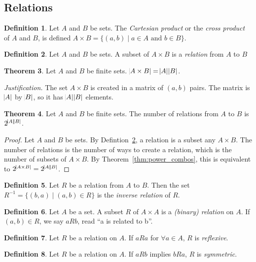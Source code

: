 \documentclass[11pt]{article}
\theoremstyle{definition}
\newtheorem{theorem}{Theorem}[section]
\newtheorem{definition}[theorem]{Definition}
\newenvironment{just}{\textit{Justification.}}{}
\begin{document}
\subsection{Relations}
\begin{definition}
    Let $A$ and $B$ be sets. The \emph{Cartesian product} or the \emph{cross product} of $A$ and $B$, is defined $A \times B = \{(a,b) \mid a\in A \text{ and } b\in B \}$.
\end{definition}
\begin{definition}
    Let $A$ and $B$ be sets. A subset of $A \times B$ is a \emph{relation} from $A$ to $B$
    \label{def:relation}
\end{definition}
\begin{theorem}
    Let $A$ and $B$ be finite sets. $\abs{A\times B} = \abs{A}\abs{B}$.
\end{theorem}
\begin{just}
    The set $A \times B$ is created in a matrix of $(a,b)$ pairs. The matrix is $\abs{A}$ by $\abs{B}$, so it has $\abs{A}\abs{B}$ elements.
\end{just}
\begin{theorem}
    Let $A$ and $B$ be finite sets. The number of relations from $A$ to $B$ is $2^{\abs{A}\abs{B}}$.
\end{theorem}
\begin{proof}
    Let $A$ and $B$ be sets. By Defintion~\ref{def:relation}, a relation is a subset any $A \times B$. The number of relations is the number of ways to create a relation, which is the number of subsets of $A \times B$. By Theorem~\ref{thm:power_combos}, this is equivalent to $2^{\abs{A \times B}}=2^{\abs{A}\abs{B}}$.
\end{proof}
\begin{definition}
    Let $R$ be a relation from $A$ to $B$. Then the set $R^{-1}=\{(b,a) \mid (a,b)\in R \}$ is the \emph{inverse relation} of $R$.
\end{definition}
\begin{definition}
    Let $A$ be a set. A subset $R$ of $A \times A$ is a \emph{(binary) relation} on $A$. If $(a,b)\in R$, we say $aRb$, read ``a is related to b''.
\end{definition}
\begin{definition}
    Let $R$ be a relation on $A$. If $aRa$ for $\forall a \in A$, $R$ is \emph{reflexive}.
\end{definition}
\begin{definition}
    Let $R$ be a relation on $A$. If $aRb$ implies $bRa$, $R$ is \emph{symmetric}.
\end{definition}
\end{document}
